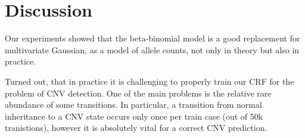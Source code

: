 \section{Discussion}
Our experiments showed that the beta-binomial model is a good replacement for multivariate Gaussian, as a model of allele counts, not only in theory but also in practice.

Turned out, that in practice it is challenging to properly train our CRF for the problem of CNV detection. One of the main problems is the relative rare abundance of some transitions. In particular, a transition from normal inheritance to a CNV state occurs only once per train case (out of \ntilde 50k tranistions), however it is absolutely vital for a correct CNV prediction. 